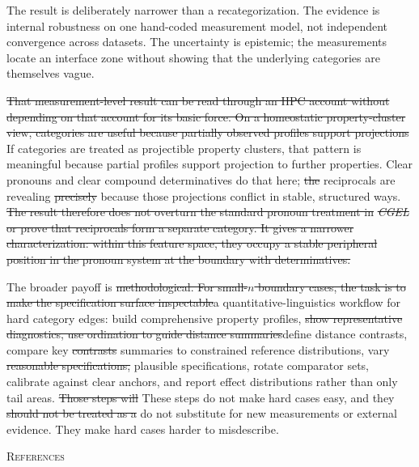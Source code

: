 \documentclass[12pt]{article}
\providecommand{\DIFaddtex}[1]{{\protect\color{DIFgreen}#1}} %
\providecommand{\DIFdeltex}[1]{{\protect\color{red}\sout{#1}}}                      %
\providecommand{\DIFaddbegin}{} %
\providecommand{\DIFaddend}{} %
\providecommand{\DIFdelbegin}{} %
\providecommand{\DIFdelend}{} %
\providecommand{\DIFadd}[1]{\texorpdfstring{\DIFaddtex{#1}}{#1}} %
\providecommand{\DIFdel}[1]{\texorpdfstring{\DIFdeltex{#1}}{}} %
\newcommand{\DIFscaledelfig}{0.5}
\newlength{\DIFdelgraphicswidth} %
\newlength{\DIFdelgraphicsheight} %
\newcommand{\DIFaddincludegraphics}[2][]{{\color{DIFgreen}\fbox{\DIFOincludegraphics[#1]{#2}}}} %
\newcommand{\DIFdelincludegraphics}[2][]{%
\sbox{\DIFdelgraphicsbox}{\DIFOincludegraphics[#1]{#2}}%
\settoboxwidth{\DIFdelgraphicswidth}{\DIFdelgraphicsbox} %
\settoboxtotalheight{\DIFdelgraphicsheight}{\DIFdelgraphicsbox} %
\scalebox{\DIFscaledelfig}{%
\parbox[b]{\DIFdelgraphicswidth}{\usebox{\DIFdelgraphicsbox}\\[-\baselineskip] \rule{\DIFdelgraphicswidth}{0em}}\llap{\resizebox{\DIFdelgraphicswidth}{\DIFdelgraphicsheight}{%
\setlength{\unitlength}{\DIFdelgraphicswidth}%
\begin{picture}(1,1)%
\thicklines\linethickness{2pt} %
{\color[rgb]{1,0,0}\put(0,0){\framebox(1,1){}}}%
{\color[rgb]{1,0,0}\put(0,0){\line( 1,1){1}}}%
{\color[rgb]{1,0,0}\put(0,1){\line(1,-1){1}}}%
\end{picture}%
}\hspace*{3pt}}} %
} %
\DeclareRobustCommand{\DIFaddbegin}{\DIFOaddbegin \let\includegraphics\DIFaddincludegraphics} %
\DeclareRobustCommand{\DIFaddend}{\DIFOaddend \let\includegraphics\DIFOincludegraphics} %
\DeclareRobustCommand{\DIFdelbegin}{\DIFOdelbegin \let\includegraphics\DIFdelincludegraphics} %
\DeclareRobustCommand{\DIFdelend}{\DIFOaddend \let\includegraphics\DIFOincludegraphics} %
\begin{document}
\DIFadd{The result is deliberately narrower than a recategorization. The }\DIFaddend evidence is internal robustness on one hand-coded measurement model, not independent convergence across datasets. The uncertainty is epistemic; the measurements locate an interface zone without showing that the underlying categories are themselves vague. \DIFdelbegin %

\DIFdel{That measurement-level result can be read through an HPC account without depending on that account for its basic force. On a homeostatic property-cluster view, categories are useful because partially observed profiles support projections }\DIFdelend \DIFaddbegin \DIFadd{If categories are treated as projectible property clusters, that pattern is meaningful because partial profiles support projection }\DIFaddend to further properties. Clear pronouns and clear compound determinatives do that here; \DIFdelbegin \DIFdel{the }\DIFdelend reciprocals are revealing \DIFdelbegin \DIFdel{precisely }\DIFdelend because those projections conflict in stable, structured ways.
\DIFdelbegin \DIFdel{The result therefore does not overturn the standard pronoun treatment in }\textit{\DIFdel{CGEL}} %
\DIFdel{or prove that reciprocals form a separate category. It gives a narrower characterization: within this feature space, they occupy a stable peripheral position in the pronoun system at the boundary with determinatives.
}\DIFdelend 

The broader payoff is \DIFdelbegin \DIFdel{methodological. For small-$n$ boundary cases, the task is to make the specification surface inspectable}\DIFdelend \DIFaddbegin \DIFadd{a quantitative-linguistics workflow for hard category edges}\DIFaddend : build comprehensive property profiles, \DIFdelbegin \DIFdel{show representative diagnostics, use ordination to guide distance summaries}\DIFdelend \DIFaddbegin \DIFadd{define distance contrasts}\DIFaddend , compare key \DIFdelbegin \DIFdel{contrasts }\DIFdelend \DIFaddbegin \DIFadd{summaries }\DIFaddend to constrained reference distributions, vary \DIFdelbegin \DIFdel{reasonable specifications, }\DIFdelend \DIFaddbegin \DIFadd{plausible specifications, rotate comparator sets, }\DIFaddend calibrate against clear anchors, and report effect distributions rather than only tail areas. \DIFdelbegin \DIFdel{Those steps will }\DIFdelend \DIFaddbegin \DIFadd{These steps do }\DIFaddend not make hard cases easy, and they \DIFdelbegin \DIFdel{should not be treated as a }\DIFdelend \DIFaddbegin \DIFadd{do not }\DIFaddend substitute for new measurements or external evidence. They make hard cases harder to misdescribe.


\clearpage
{\centering\textsc{References}}

\begin{sloppypar}
\printbibliography[heading=none]
\end{sloppypar}
\end{document}
